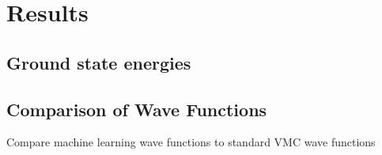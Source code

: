 \chapter{Results} \label{sec:results}

\section{Ground state energies}

\section{Comparison of Wave Functions}
Compare machine learning wave functions to standard VMC wave functions
